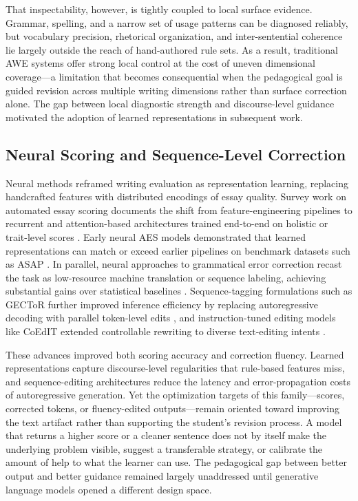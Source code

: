 \documentclass[preprint,12pt]{elsarticle}
\begin{document}
That inspectability, however, is tightly coupled to local surface evidence. Grammar, spelling, and a narrow set of usage patterns can be diagnosed reliably, but vocabulary precision, rhetorical organization, and inter-sentential coherence lie largely outside the reach of hand-authored rule sets. As a result, traditional AWE systems offer strong local control at the cost of uneven dimensional coverage---a limitation that becomes consequential when the pedagogical goal is guided revision across multiple writing dimensions rather than surface correction alone. The gap between local diagnostic strength and discourse-level guidance motivated the adoption of learned representations in subsequent work.

\subsection{Neural Scoring and Sequence-Level Correction}

Neural methods reframed writing evaluation as representation learning, replacing handcrafted features with distributed encodings of essay quality. Survey work on automated essay scoring documents the shift from feature-engineering pipelines to recurrent and attention-based architectures trained end-to-end on holistic or trait-level scores \cite{ke2019aes}. Early neural AES models demonstrated that learned representations can match or exceed earlier pipelines on benchmark datasets such as ASAP \cite{taghipour-ng-2016-neural}. In parallel, neural approaches to grammatical error correction recast the task as low-resource machine translation or sequence labeling, achieving substantial gains over statistical baselines \cite{junczysdowmunt2018approaching}. Sequence-tagging formulations such as GECToR further improved inference efficiency by replacing autoregressive decoding with parallel token-level edits \cite{omelianchuk-etal-2020-gector}, and instruction-tuned editing models like CoEdIT extended controllable rewriting to diverse text-editing intents \cite{raheja2023coedit}.

These advances improved both scoring accuracy and correction fluency. Learned representations capture discourse-level regularities that rule-based features miss, and sequence-editing architectures reduce the latency and error-propagation costs of autoregressive generation. Yet the optimization targets of this family---scores, corrected tokens, or fluency-edited outputs---remain oriented toward improving the text artifact rather than supporting the student's revision process. A model that returns a higher score or a cleaner sentence does not by itself make the underlying problem visible, suggest a transferable strategy, or calibrate the amount of help to what the learner can use. The pedagogical gap between better output and better guidance remained largely unaddressed until generative language models opened a different design space.
\end{document}
